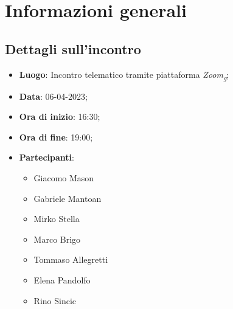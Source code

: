 \section{Informazioni generali}

\subsection{Dettagli sull'incontro}
\begin{itemize}
\item \textbf{Luogo}: Incontro telematico tramite piattaforma \textit{Zoom\textsubscript{g}};
\item \textbf{Data}: 06-04-2023;
\item \textbf{Ora di inizio}: 16:30;
\item \textbf{Ora di fine}: 19:00;
\item \textbf{Partecipanti}: 
\begin{itemize}
	\item Giacomo Mason
	\item Gabriele Mantoan
	\item Mirko Stella
	\item Marco Brigo
	\item Tommaso Allegretti
	\item Elena Pandolfo
	\item Rino Sincic
\end{itemize}
\end{itemize}